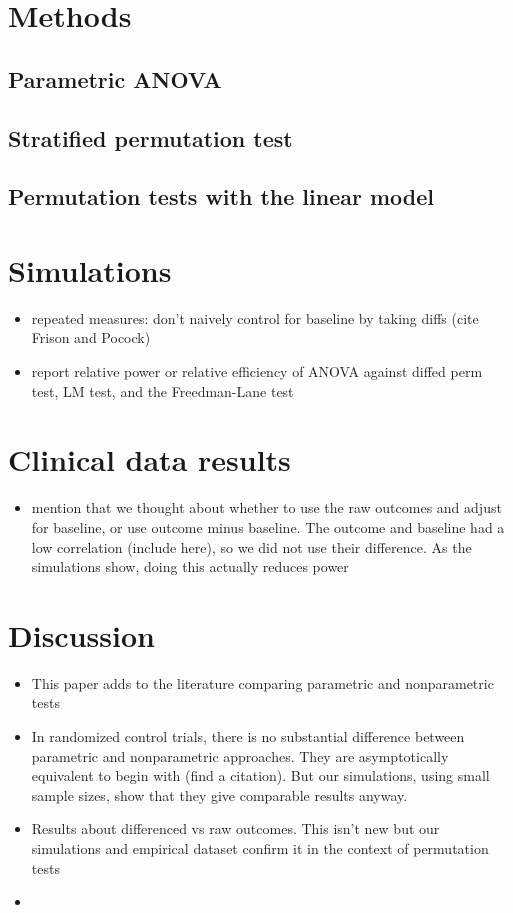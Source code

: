\documentclass[12pt]{article}
\newcommand{\bit}{\begin{itemize}}
\newcommand{\eit}{\end{itemize}}
\begin{document}
\section{Methods}

\subsection{Parametric ANOVA}

\subsection{Stratified permutation test}

\subsection{Permutation tests with the linear model}

\section{Simulations}

\bit
\item repeated measures: don't naively control for baseline by taking diffs (cite Frison and Pocock)
\item report relative power or relative efficiency of ANOVA against diffed perm test, LM test, and the Freedman-Lane test
\eit


\section{Clinical data results}

\bit
\item mention that we thought about whether to use the raw outcomes and adjust for baseline, or use outcome minus baseline. The outcome and baseline had a low correlation (include here), so we did not use their difference. As the simulations show, doing this actually reduces power
\eit


\section{Discussion}
\bit
\item This paper adds to the literature comparing parametric and nonparametric tests
\item In randomized control trials, there is no substantial difference between parametric and nonparametric approaches.  They are asymptotically equivalent to begin with (find a citation). But our simulations, using small sample sizes, show that they give comparable results anyway.
\item Results about differenced vs raw outcomes. This isn't new but our simulations and empirical dataset confirm it in the context of permutation tests
\item 
\eit
\end{document}
